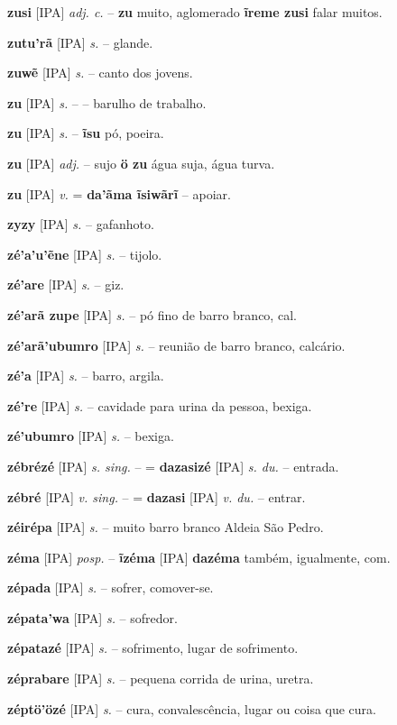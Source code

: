 \textbf{zusi} [IPA] \textit{adj. c.} -- \textbf{zu} muito, aglomerado  \textbf{ĩreme zusi} falar muitos.

\textbf{zutu'rã} [IPA] \textit{s.} -- glande.

\textbf{zuwẽ} [IPA] \textit{s.} -- canto dos jovens.

\textbf{zu} [IPA] \textit{ s.} -- -- barulho de trabalho.

\textbf{zu} [IPA] \textit{ s.} -- \textbf{ĩsu} pó, poeira.

\textbf{zu} [IPA] \textit{adj.} -- sujo  \textbf{ö zu} água suja, água turva.

\textbf{zu} [IPA] \textit{v.} = \textbf{da'ãma ĩsiwãrĩ} -- apoiar.

\textbf{zyzy} [IPA] \textit{s.} -- gafanhoto.

\textbf{zé'a'u'ẽne} [IPA] \textit{s.} -- tijolo.

\textbf{zé'are} [IPA] \textit{s.} -- giz.

\textbf{zé'arã zupe} [IPA] \textit{s.} -- pó fino de barro branco, cal.

\textbf{zé'arã'ubumro} [IPA] \textit{s.} -- reunião de barro branco, calcário.

\textbf{zé'a} [IPA] \textit{s.} -- barro, argila.

\textbf{zé're} [IPA] \textit{s.} -- cavidade para urina da pessoa, bexiga.

\textbf{zé'ubumro} [IPA] \textit{s.} -- bexiga.

\textbf{zébrézé} [IPA] \textit{s. sing.} -- = \textbf{dazasizé} [IPA] \textit{s. du.} -- entrada.

\textbf{zébré} [IPA] \textit{v. sing.} -- = \textbf{dazasi} [IPA] \textit{v. du.} -- entrar.

\textbf{zéirépa} [IPA] \textit{s.} -- muito barro branco  Aldeia São Pedro.

\textbf{zéma} [IPA] \textit{posp.} -- \textbf{ĩzéma} [IPA] \textbf{dazéma} também, igualmente, com.

\textbf{zépada} [IPA] \textit{s.} -- sofrer, comover-se.

\textbf{zépata'wa} [IPA] \textit{s.} -- sofredor.

\textbf{zépatazé} [IPA] \textit{s.} -- sofrimento, lugar de sofrimento.

\textbf{zéprabare} [IPA] \textit{s.} -- pequena corrida de urina, uretra.

\textbf{zéptö'özé} [IPA] \textit{s.} -- cura, convalescência, lugar ou coisa que cura.

